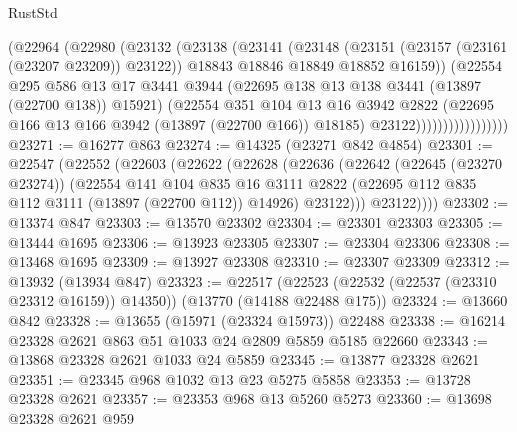 \begin{lexlean}{RustStd}
\begin{coremodule}
                          (@22964
                            (@22980
                              (@23132
                                (@23138
                                  (@23141
                                    (@23148
                                      (@23151 (@23157 (@23161 (@23207 @23209)) @23122))
                                      @18843
                                      @18846
                                      @18849
                                      @18852
                                      @16159))
                                  (@22554
                                    @295
                                    @586
                                    @13
                                    @17
                                    @3441
                                    @3944
                                    (@22695 @138 @13 @138 @3441 (@13897 (@22700 @138)) @15921)
                                    (@22554
                                      @351
                                      @104
                                      @13
                                      @16
                                      @3942
                                      @2822
                                      (@22695 @166 @13 @166 @3942 (@13897 (@22700 @166)) @18185)
                                      @23122)))))))))))))))))
@23271 := @16277 @863
@23274 := @14325 (@23271 @842 @4854)
@23301 := @22547
    (@22552
      (@22603
        (@22622
          (@22628
            (@22636
              (@22642
                (@22645 (@23270 @23274))
                (@22554
                  @141
                  @104
                  @835
                  @16
                  @3111
                  @2822
                  (@22695 @112 @835 @112 @3111 (@13897 (@22700 @112)) @14926)
                  @23122)))
            @23122))))
@23302 := @13374 @847
@23303 := @13570 @23302
@23304 := @23301 @23303
@23305 := @13444 @1695
@23306 := @13923 @23305
@23307 := @23304 @23306
@23308 := @13468 @1695
@23309 := @13927 @23308
@23310 := @23307 @23309
@23312 := @13932 (@13934 @847)
@23323 := @22517
    (@22523 (@22532 (@22537 (@23310 @23312 @16159)) @14350))
    (@13770 (@14188 @22488 @175))
@23324 := @13660 @842
@23328 := @13655 (@15971 (@23324 @15973)) @22488
@23338 := @16214 @23328 @2621 @863 @51 @1033 @24 @2809 @5859 @5185 @22660
@23343 := @13868 @23328 @2621 @1033 @24 @5859
@23345 := @13877 @23328 @2621
@23351 := @23345 @968 @1032 @13 @23 @5275 @5858
@23353 := @13728 @23328 @2621
@23357 := @23353 @968 @13 @5260 @5273
@23360 := @13698 @23328 @2621 @959

\end{coremodule}
\end{lexlean}
